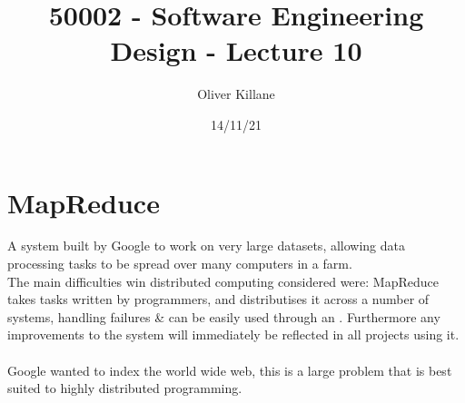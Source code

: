 \documentclass{report}
\title{50002 - Software Engineering Design - Lecture 10}
\author{Oliver Killane}
\date{14/11/21}
\begin{document}
\maketitle
{}

\section*{MapReduce}
A system built by Google to work on very large datasets, allowing data processing tasks to be spread over many computers in a farm.
\\
The main difficulties win distributed computing considered were:
MapReduce takes tasks written by programmers, and distributises it across a number of systems, handling failures \& can be easily used through an .
Furthermore any improvements to the system will immediately be reflected in all projects using it.
\\
\\ Google wanted to index the world wide web, this is a large problem that is best suited to highly distributed programming.
\end{document}
